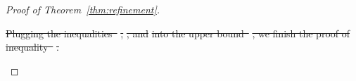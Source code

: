 \documentclass[lettersize,onecolumn,journal]{IEEEtran}
\theoremstyle{definition}
\theoremstyle{definition}
\newcommand{\of}[1]{\left(#1\right)}
\providecommand{\DIFdeltex}[1]{{\protect\color{red}\sout{#1}}}                      %
\providecommand{\DIFdel}[1]{\texorpdfstring{\DIFdeltex{#1}}{}} %
\begin{document}
\begin{proof}[Proof of Theorem~\ref{thm:refinement}]
\begin{enumerate}
\DIFdel{Plugging the inequalities~}%
\DIFdel{, }%
\DIFdel{, and }%
\DIFdel{into the upper bound~}%
\DIFdel{, we finish the proof of inequality~}%
\DIFdel{.
    }%




\end{enumerate}
\end{proof}
\end{document}
